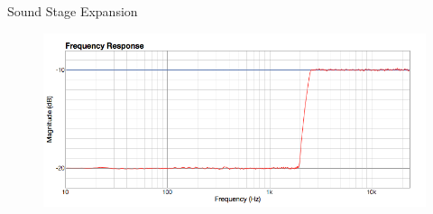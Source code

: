 \documentclass{beamer}
\begin{document}
\begin{frame}[t]{Sound Stage Expansion}
\begin{figure}[b]
\includegraphics[height=0.37\textwidth]{figure/sxp.png}
\end{figure}

\end{frame}


\end{document}
